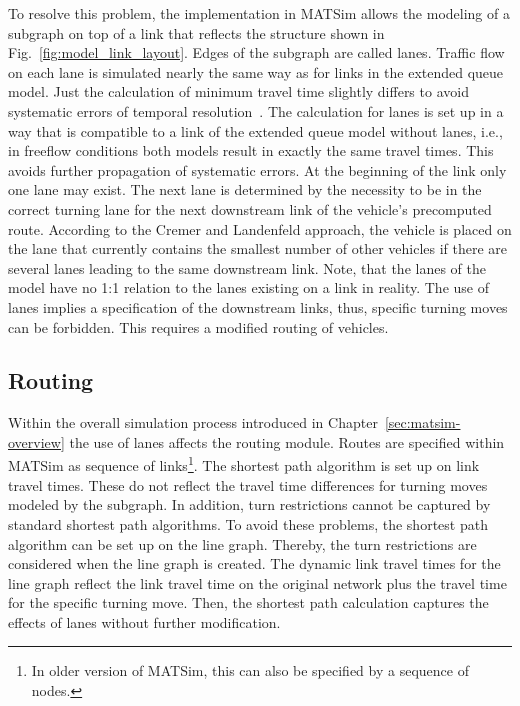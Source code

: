 To resolve this problem, the implementation in MATSim allows the modeling of a subgraph on top of a link that reflects the structure shown in Fig.~\ref{fig:model_link_layout}. 
Edges of the subgraph are called \alert{lanes}. 
Traffic flow on each lane is simulated nearly the same way as for links in the extended queue model. 
Just the calculation of minimum travel time slightly differs to avoid systematic errors of temporal resolution~\citep[][p.~38]{GawronPhd}. 
The calculation for lanes is set up in a way that is compatible to a link of the extended queue model without lanes, i.e., in freeflow conditions both models result in exactly the same travel times. 
This avoids further propagation of systematic errors. 
At the beginning of the link only one lane may exist. 
%
The next lane is determined by the necessity to be in the correct turning lane for the next downstream link of the vehicle's precomputed route.
According to the Cremer and Landenfeld approach, the vehicle is placed on the lane that currently contains the smallest number of other vehicles if there are several lanes leading to the same downstream link.
Note, that the lanes of the model have no 1:1 relation to the lanes existing on a link in reality.
The use of lanes implies a specification of the downstream links, thus, specific turning moves can be forbidden. 
This requires a modified routing of vehicles.

\subsection{Routing}
Within the overall simulation process introduced in Chapter~\ref{sec:matsim-overview} the use of lanes affects the routing module. 
Routes are specified within MATSim as sequence of links\footnote{In older version of MATSim, this can also be specified by a sequence of nodes.}.  
The shortest path algorithm is set up on link travel times. 
These do not reflect the travel time differences for turning moves modeled by the subgraph. 
In addition, turn restrictions cannot be captured by standard shortest path algorithms. 
To avoid these problems, the shortest path algorithm can be set up on the line graph. 
Thereby, the turn restrictions are considered when the line graph is created. 
The dynamic link travel times for the line graph reflect the link travel time on the original network plus the travel time for the specific turning move. 
Then, the shortest path calculation captures the effects of lanes without further modification. 

